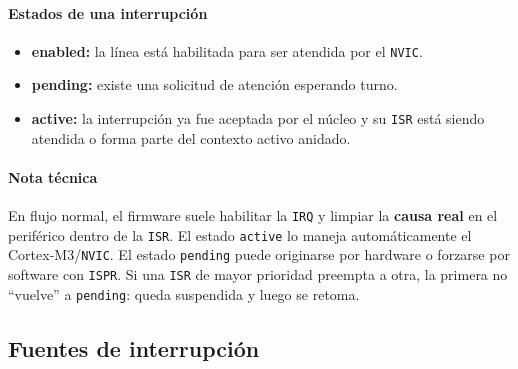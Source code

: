 \paragraph{Estados de una interrupci\'on}
\begin{itemize}
  \item \textbf{enabled:} la l\'inea est\'a habilitada para ser atendida por el \texttt{NVIC}.
  \item \textbf{pending:} existe una solicitud de atenci\'on esperando turno.
  \item \textbf{active:} la interrupci\'on ya fue aceptada por el n\'ucleo y su \texttt{ISR} est\'a siendo atendida o forma parte del contexto activo anidado.
\end{itemize}

\paragraph{Nota t\'ecnica}
En flujo normal, el firmware suele habilitar la \texttt{IRQ} y limpiar la \textbf{causa real} en el perif\'erico dentro de la \texttt{ISR}. El estado \texttt{active} lo maneja autom\'aticamente el Cortex-M3/\texttt{NVIC}. El estado \texttt{pending} puede originarse por hardware o forzarse por software con \texttt{ISPR}. Si una \texttt{ISR} de mayor prioridad preempta a otra, la primera no ``vuelve'' a \texttt{pending}: queda suspendida y luego se retoma.

\subsection{Fuentes de interrupci\'on}
\scriptsize
\renewcommand{\arraystretch}{1.12}
\setlength{\LTleft}{0pt}
\setlength{\LTright}{0pt}

